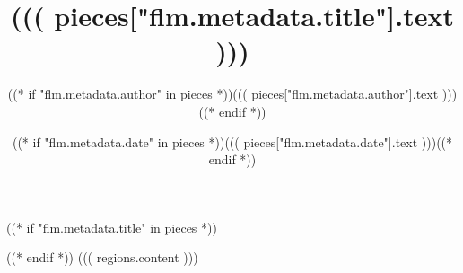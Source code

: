 \documentclass{article}
\begin{document}
((* if "flm.metadata.title" in pieces *))
\title{((( pieces["flm.metadata.title"].text )))}
\author{((* if "flm.metadata.author" in pieces *))((( pieces["flm.metadata.author"].text )))((* endif *))}
\date{((* if "flm.metadata.date" in pieces *))((( pieces["flm.metadata.date"].text )))((* endif *))}
\maketitle
((* endif *))
((( regions.content )))
\end{document}
